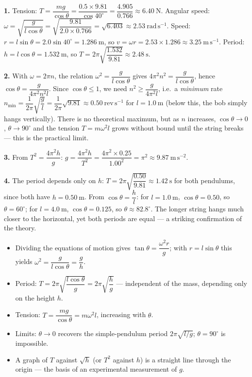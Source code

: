 \documentclass[11pt]{article}
\begin{document}
\begin{corrige}[Exercise 1]
\textbf{1.} Tension: $T = \dfrac{mg}{\cos\theta} = \dfrac{0.5 \times 9.81}{\cos 40^{\circ}} = \dfrac{4.905}{0.766} \approx 6.40\ \mathrm{N}$.
Angular speed: $\omega = \sqrt{\dfrac{g}{l\cos\theta}} = \sqrt{\dfrac{9.81}{2.0 \times 0.766}} = \sqrt{6.403} \approx 2.53\ \mathrm{rad\,s^{-1}}$.
Speed: $r = l\sin\theta = 2.0\sin 40^{\circ} = 1.286\ \mathrm{m}$, so $v = \omega r = 2.53 \times 1.286 \approx 3.25\ \mathrm{m\,s^{-1}}$.
Period: $h = l\cos\theta = 1.532\ \mathrm{m}$, so $T = 2\pi\sqrt{\dfrac{1.532}{9.81}} \approx 2.48\ \mathrm{s}$.

\textbf{2.} With $\omega = 2\pi n$, the relation $\omega^{2} = \dfrac{g}{l\cos\theta}$ gives $4\pi^{2}n^{2} = \dfrac{g}{l\cos\theta}$, hence $\cos\theta = \dfrac{g}{4\pi^{2}n^{2}l}$. Since $\cos\theta \leq 1$, we need $n^{2} \geq \dfrac{g}{4\pi^{2}l}$, i.e.\ a \emph{minimum} rate $n_{\min} = \dfrac{1}{2\pi}\sqrt{\dfrac{g}{l}} = \dfrac{1}{2\pi}\sqrt{9.81} \approx 0.50\ \mathrm{rev\,s^{-1}}$ for $l = 1.0\ \mathrm{m}$ (below this, the bob simply hangs vertically). There is no theoretical maximum, but as $n$ increases, $\cos\theta \to 0$, $\theta \to 90^{\circ}$ and the tension $T = m\omega^{2}l$ grows without bound until the string breaks — this is the practical limit.

\textbf{3.} From $T^{2} = \dfrac{4\pi^{2}h}{g}$: $g = \dfrac{4\pi^{2}h}{T^{2}} = \dfrac{4\pi^{2}\times 0.25}{1.00^{2}} = \pi^{2} \approx 9.87\ \mathrm{m\,s^{-2}}$.

\textbf{4.} The period depends only on $h$: $T = 2\pi\sqrt{\dfrac{0.50}{9.81}} \approx 1.42\ \mathrm{s}$ for both pendulums, since both have $h = 0.50\ \mathrm{m}$. From $\cos\theta = \dfrac{h}{l}$: for $l = 1.0\ \mathrm{m}$, $\cos\theta = 0.50$, so $\theta = 60^{\circ}$; for $l = 4.0\ \mathrm{m}$, $\cos\theta = 0.125$, so $\theta \approx 82.8^{\circ}$. The longer string hangs much closer to the horizontal, yet both periods are equal — a striking confirmation of the theory.
\end{corrige}

\begin{aretenir}
\begin{itemize}
\item Dividing the equations of motion gives $\tan\theta = \dfrac{\omega^{2}r}{g}$; with $r = l\sin\theta$ this yields $\omega^{2} = \dfrac{g}{l\cos\theta} = \dfrac{g}{h}$.
\item Period: $T = 2\pi\sqrt{\dfrac{l\cos\theta}{g}} = 2\pi\sqrt{\dfrac{h}{g}}$ — independent of the mass, depending only on the height $h$.
\item Tension: $T = \dfrac{mg}{\cos\theta} = m\omega^{2}l$, increasing with $\theta$.
\item Limits: $\theta \to 0$ recovers the simple-pendulum period $2\pi\sqrt{l/g}$; $\theta = 90^{\circ}$ is impossible.
\item A graph of $T$ against $\sqrt{h}$ (or $T^{2}$ against $h$) is a straight line through the origin — the basis of an experimental measurement of $g$.
\end{itemize}
\end{aretenir}
\end{document}

